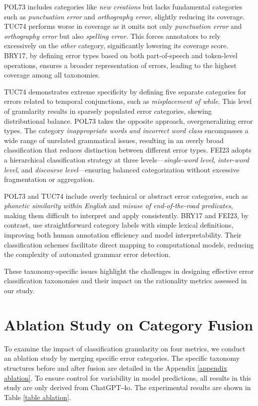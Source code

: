 POL73 includes categories like \textit{new creations} but lacks fundamental categories such as \textit{punctuation error} and \textit{orthography error}, slightly reducing its coverage. TUC74 performs worse in coverage as it omits not only \textit{punctuation error} and \textit{orthography error} but also \textit{spelling error}. This forces annotators to rely excessively on the \textit{other} category, significantly lowering its coverage score. BRY17, by defining error types based on both part-of-speech and token-level operations, ensures a broader representation of errors, leading to the highest coverage among all taxonomies.  

TUC74 demonstrates extreme specificity by defining five separate categories for errors related to temporal conjunctions, such as \textit{misplacement of while}. This level of granularity results in sparsely populated error categories, skewing distributional balance. POL73 takes the opposite approach, overgeneralizing error types. The category \textit{inappropriate words and incorrect word class} encompasses a wide range of unrelated grammatical issues, resulting in an overly broad classification that reduces distinction between different error types. FEI23 adopts a hierarchical classification strategy at three levels—\textit{single-word level}, \textit{inter-word level}, and \textit{discourse level}—ensuring balanced categorization without excessive fragmentation or aggregation.  

POL73 and TUC74 include overly technical or abstract error categories, such as \textit{phonetic similarity within English} and \textit{misuse of end-of-the-road predicates}, making them difficult to interpret and apply consistently. BRY17 and FEI23, by contrast, use straightforward category labels with simple lexical definitions, improving both human annotation efficiency and model interpretability. Their classification schemes facilitate direct mapping to computational models, reducing the complexity of automated grammar error detection.  

These taxonomy-specific issues highlight the challenges in designing effective error classification taxonomies and their impact on the rationality metrics assessed in our study.  

\section{Ablation Study on Category Fusion}
\label{appendix ablation study}
To examine the impact of classification granularity on four metrics, we conduct an ablation study by merging specific error categories. The specific taxonomy structures before and after fusion are detailed in the Appendix \ref{appendix ablation}. To ensure control for variability in model predictions, all results in this study are only derived from ChatGPT-4o. The experimental results are shown in Table \ref{table ablation}.


